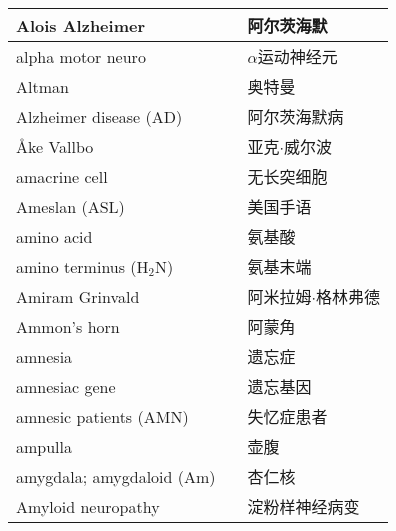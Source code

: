 \begin{longtable}{lll}
	\midrule
	Alois Alzheimer     &&  阿尔茨海默  \\
	
	\midrule
	alpha motor neuro     &&  $\alpha$运动神经元  \\
	
	\midrule
	Altman     &&  奥特曼  \\
	
	\midrule
	Alzheimer disease (AD)     &&  阿尔茨海默病  \\
	
	\midrule
	Åke Vallbo     &&  亚克$\cdot$威尔波  \\
	
	\midrule
	amacrine cell     && 无长突细胞   \\
	
	\midrule
	Ameslan (ASL)    && 美国手语   \\
	
	\midrule
	amino acid   && 氨基酸   \\
	
	\midrule
	amino terminus (H$_2$N)   && 氨基末端   \\
	
	\midrule
	Amiram Grinvald    && 阿米拉姆$\cdot$格林弗德   \\
	
	\midrule
	Ammon's horn    && 阿蒙角   \\
	
	\midrule
	amnesia    && 遗忘症   \\
	
	\midrule
	amnesiac gene    && 遗忘基因   \\
	
	\midrule
	amnesic patients (AMN)    && 失忆症患者   \\
	
	\midrule
	ampulla    && 壶腹   \\
	
	\midrule
	amygdala; amygdaloid (Am)    && 杏仁核   \\
	
	\midrule
	Amyloid neuropathy     && 淀粉样神经病变   \\
	

\end{longtable}
